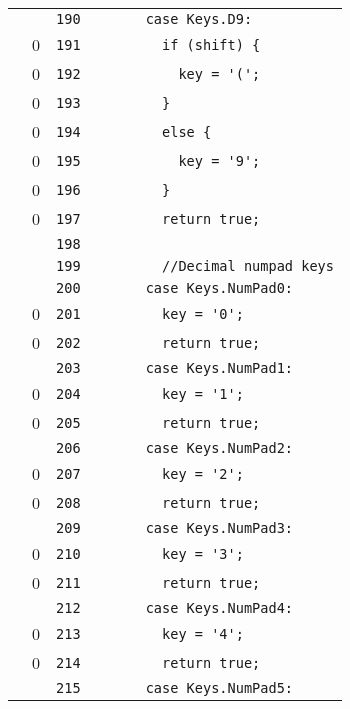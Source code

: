 \documentclass[a4paper,10pt]{article}
\begin{document}
\begin{longtable}[l]{lrrl}
\cellcolor{gray} &  & \verb~190~ & \verb~      case Keys.D9:~\\
\cellcolor{red} & 0 & \verb~191~ & \verb~        if (shift) {~\\
\cellcolor{red} & 0 & \verb~192~ & \verb~          key = '(';~\\
\cellcolor{red} & 0 & \verb~193~ & \verb~        }~\\
\cellcolor{red} & 0 & \verb~194~ & \verb~        else {~\\
\cellcolor{red} & 0 & \verb~195~ & \verb~          key = '9';~\\
\cellcolor{red} & 0 & \verb~196~ & \verb~        }~\\
\cellcolor{red} & 0 & \verb~197~ & \verb~        return true;~\\
\cellcolor{gray} &  & \verb~198~ & \verb~~\\
\cellcolor{gray} &  & \verb~199~ & \verb~        //Decimal numpad keys~\\
\cellcolor{gray} &  & \verb~200~ & \verb~      case Keys.NumPad0:~\\
\cellcolor{red} & 0 & \verb~201~ & \verb~        key = '0';~\\
\cellcolor{red} & 0 & \verb~202~ & \verb~        return true;~\\
\cellcolor{gray} &  & \verb~203~ & \verb~      case Keys.NumPad1:~\\
\cellcolor{red} & 0 & \verb~204~ & \verb~        key = '1';~\\
\cellcolor{red} & 0 & \verb~205~ & \verb~        return true;~\\
\cellcolor{gray} &  & \verb~206~ & \verb~      case Keys.NumPad2:~\\
\cellcolor{red} & 0 & \verb~207~ & \verb~        key = '2';~\\
\cellcolor{red} & 0 & \verb~208~ & \verb~        return true;~\\
\cellcolor{gray} &  & \verb~209~ & \verb~      case Keys.NumPad3:~\\
\cellcolor{red} & 0 & \verb~210~ & \verb~        key = '3';~\\
\cellcolor{red} & 0 & \verb~211~ & \verb~        return true;~\\
\cellcolor{gray} &  & \verb~212~ & \verb~      case Keys.NumPad4:~\\
\cellcolor{red} & 0 & \verb~213~ & \verb~        key = '4';~\\
\cellcolor{red} & 0 & \verb~214~ & \verb~        return true;~\\
\cellcolor{gray} &  & \verb~215~ & \verb~      case Keys.NumPad5:~\\

\end{longtable}
\end{document}
